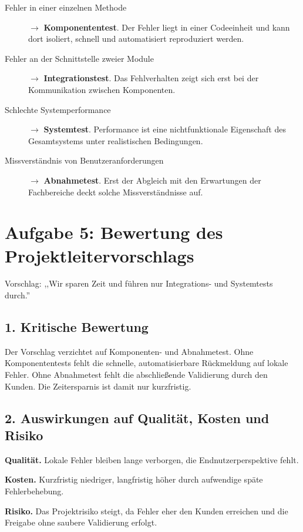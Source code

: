 \documentclass[
	fontsize=12pt,          %
	paper=a4,               %
	numbers=noenddot,       %
	listof=totoc,           %
	listof=entryprefix,     %
	listof=nochaptergap,    %
	bibliography=totoc,     %
	parskip=half,           %
	openany                 %
]{scrbook}
\begin{document}
\begin{description}
	\item[Fehler in einer einzelnen Methode] $\rightarrow$ \textbf{Komponententest}.
	      Der Fehler liegt in einer Codeeinheit und kann dort isoliert, schnell und automatisiert reproduziert werden.
	\item[Fehler an der Schnittstelle zweier Module] $\rightarrow$ \textbf{Integrationstest}.
	      Das Fehlverhalten zeigt sich erst bei der Kommunikation zwischen Komponenten.
	\item[Schlechte Systemperformance] $\rightarrow$ \textbf{Systemtest}.
	      Performance ist eine nichtfunktionale Eigenschaft des Gesamtsystems unter realistischen Bedingungen.
	\item[Missverständnis von Benutzeranforderungen] $\rightarrow$ \textbf{Abnahmetest}.
	      Erst der Abgleich mit den Erwartungen der Fachbereiche deckt solche Missverständnisse auf.
\end{description}


\chapter*{Aufgabe 5: Bewertung des Projektleitervorschlags}

Vorschlag: ,,Wir sparen Zeit und führen nur Integrations- und Systemtests durch.''


\section*{1. Kritische Bewertung}

Der Vorschlag verzichtet auf Komponenten- und Abnahmetest.
Ohne Komponententests fehlt die schnelle, automatisierbare Rückmeldung auf lokale Fehler.
Ohne Abnahmetest fehlt die abschließende Validierung durch den Kunden.
Die Zeitersparnis ist damit nur kurzfristig.


\section*{2. Auswirkungen auf Qualität, Kosten und Risiko}

\textbf{Qualität.}
Lokale Fehler bleiben lange verborgen, die Endnutzerperspektive fehlt.

\textbf{Kosten.}
Kurzfristig niedriger, langfristig höher durch aufwendige späte Fehlerbehebung.

\textbf{Risiko.}
Das Projektrisiko steigt, da Fehler eher den Kunden erreichen und die Freigabe ohne saubere Validierung erfolgt.
\end{document}
